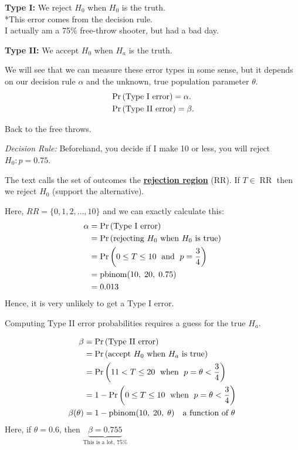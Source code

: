 
\nnl \textbf{Type I:} We reject $H_0$ when $H_0$ is the truth.\\
*This error comes from the decision rule.\\
\example* I actually am a 75\% free-throw shooter, but had a bad day.

\nl \textbf{Type II:} We accept $H_0$ when $H_a$ is the truth.

\nnl We will see that we can measure these error types in some sense, but it depends on our decision rule \setRed $\alpha$ \setBlack and the unknown, true population parameter $\theta$.
\begin{align*}
    &\P{\text{Type I error}} = \alpha.\\
    &\P{\text{Type II error}} = \beta.
\end{align*}


\example* Back to the free throws.

\nl \textit{Decision Rule:} Beforehand, you decide if I make 10 or less, you will reject $H_0 : p = 0.75$.

\nl The text calls the set of outcomes the \underline{\textbf{\color{neonorange}rejection region}} (RR). If $T \in \operatorname{RR}$ then we reject $H_0$ (support the alternative).

\nl Here, $RR = \{0,1,2,\dots,10\}$ and we can exactly calculate this:
\begin{align*}
    \alpha &= \P{\text{Type I error}}\\
    &= \P{\text{rejecting } H_0 \text{ when } H_0 \text{ is true}}\\
    &= \P{0 \leq T \leq 10 \;\text{ and }\; p = \frac34}\\
    &= \operatorname{pbinom}(10,\;20,\;0.75)\\
    &= 0.013
\end{align*}
Hence, it is very unlikely to get a Type I error.

\nl Computing Type II error probabilities requires a guess for the true $H_a$.

\begin{align*}
    \beta &= \P{\text{Type II error}}\\
    &= \P{\text{accept } H_0 \text{ when } H_a \text{ is true}}\\
    &= \P{11 < T \leq 20 \;\text{ when }\; p = \theta < \frac34}\\
    &= 1 - \P{0 \leq T \leq 10  \;\text{ when }\; p = \theta < \frac34}\\\beta(\theta) &= 1 - \operatorname{pbinom}(10,\;20,\;\theta) \quad \text{a function of } \theta\\
\end{align*}
Here, if $\theta = 0.6$, then $\underbrace{\beta = 0.755}_{\text{This is a lot, 75\%}}$

